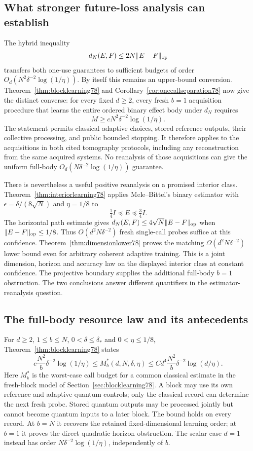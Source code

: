 \subsection{What stronger future-loss analysis can establish}
The hybrid inequality
\[
 d_N(E,F)\le 2N\|E-F\|_{\rm op}
\]
transfers both one-use guarantees to sufficient budgets of order
$O_d(N^2\delta^{-2}\log(1/\eta))$. By itself this remains an
upper-bound conversion. Theorem~\ref{thm:blocklearning78} and
Corollary~\ref{cor:onecallseparation78} now give the distinct
converse: for every fixed $d\ge2$, every fresh $b=1$ acquisition
procedure that learns the entire ordered binary effect body under
$d_N$ requires
\[
 M\ge cN^2\delta^{-2}\log(1/\eta).
\]
The statement permits classical adaptive choices, stored reference
outputs, their collective processing, and public bounded stopping.
It therefore applies to the acquisitions in both cited tomography
protocols, including any reconstruction from the same acquired
systems. No reanalysis of those acquisitions can give the uniform
full-body $O_d(N\delta^{-2}\log(1/\eta))$ guarantee.

There is nevertheless a useful positive reanalysis on a promised
interior class. Theorem~\ref{thm:interiorlearning78} applies
Mele--Bittel's binary estimator with
$\epsilon=\delta/(8\sqrt N)$ and $\eta=1/8$ to
\[
 \tfrac14 I\preceq E\preceq\tfrac34 I.
\]
The horizontal path estimate gives
$d_N(E,F)\le4\sqrt N\|E-F\|_{\rm op}$ when
$\|E-F\|_{\rm op}\le1/8$. Thus $O(d^2N\delta^{-2})$
fresh single-call probes suffice at this confidence.
Theorem~\ref{thm:dimensionlower78} proves the matching
$\Omega(d^2N\delta^{-2})$ lower bound even for arbitrary coherent
adaptive training. This is a joint dimension, horizon and accuracy
law on the displayed interior class at constant confidence.
The projective boundary supplies the additional full-body
$b=1$ obstruction. The two conclusions answer different
quantifiers in the estimator-reanalysis question.

\subsection{The full-body resource law and its antecedents}
For $d\ge2$, $1\le b\le N$, $0<\delta\le\delta_*$ and
$0<\eta\le1/8$, Theorem~\ref{thm:blocklearning78} states
\[
 c\frac{N^2}{b}\delta^{-2}\log(1/\eta)
 \le M_b^*(d,N,\delta,\eta)
 \le Cd^4\frac{N^2}{b}\delta^{-2}\log(d/\eta).
\]
Here $M_b^*$ is the worst-case call budget for a common classical
estimate in the fresh-block model of Section~\ref{sec:blocklearning78}.
A block may use its own reference and adaptive quantum controls;
only the classical record can determine the next fresh probe.
Stored quantum outputs may be processed jointly but cannot become
quantum inputs to a later block. The bound holds on every record.
At $b=N$ it recovers the retained fixed-dimensional learning order;
at $b=1$ it proves the direct quadratic-horizon obstruction.
The scalar case $d=1$ instead has order
$N\delta^{-2}\log(1/\eta)$, independently of $b$.

